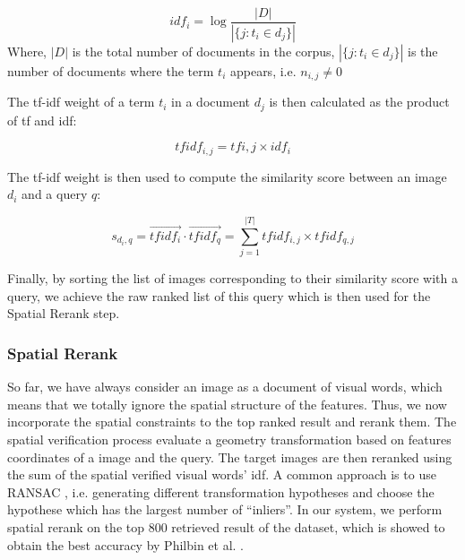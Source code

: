 \begin{equation}
        idf_{i} = \log{\frac{\left|D\right|}{\left|\{j: t_{i} \in d_{j}\}\right|}}
\end{equation}
Where, $\left|D\right|$ is the total number of documents in the corpus, $\left|\{j: t_{i} \in d_{j}\}\right|$ is the number of documents where the term $t_{i}$ appears, i.e. $n_{i, j} \ne 0$

The tf-idf weight of a term $t_{i}$ in a document $d_{j}$ is then calculated as the product of tf and idf:

\begin{equation}
{tfidf}_{i, j} = tf{i, j} \times idf_{i}
\end{equation}

The tf-idf weight is then used to compute the similarity score between an image $d_{i}$ and a query $q$:

\begin{equation}
s_{d_{i}, q} = \vec{{tfidf}_{i}} \cdot \vec{{tfidf}_{q}} = \sum\limits_{j = 1}^{\left|T\right|} {tfidf}_{i, j} \times {tfidf}_{q, j}
\end{equation} 

Finally, by sorting the list of images corresponding to their similarity score with a query, we achieve the raw ranked list of this query which is then used for the Spatial Rerank step.

\subsubsection{Spatial Rerank} \label{section:spatial_rerank}

So far, we have always consider an image as a document of visual words, which means that we totally ignore the spatial structure of the features. Thus, we now incorporate the spatial constraints to the top ranked result and rerank them. The spatial verification process evaluate a geometry transformation based on features coordinates of a image and the query. The target images are then reranked using the sum of the spatial verified visual words' idf. A common approach is to use RANSAC \cite{Fischler1981}, i.e. generating different transformation hypotheses and choose the hypothese which has the largest number of ``inliers''. In our system, we perform spatial rerank on the top 800 retrieved result of the dataset, which is showed to obtain the best accuracy by Philbin et al. \cite{2}.
